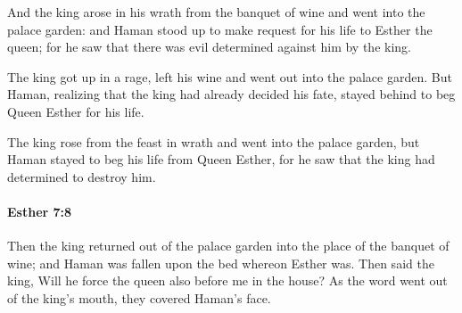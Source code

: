 			\begin{versebox}
					\item[BHS] 
					\item[LXX] 
					\item[ASV] And the king arose in his wrath from the banquet of wine and went into the palace garden: and Haman stood up to make request for his life to Esther the queen; for he saw that there was evil determined against him by the king.
					\item[NIV] The king got up in a rage, left his wine and went out into the palace garden. But Haman, realizing that the king had already decided his fate, stayed behind to beg Queen Esther for his life.
					\item[NRSV] The king rose from the feast in wrath and went into the palace garden, but Haman stayed to beg his life from Queen Esther, for he saw that the king had determined to destroy him.
			\end{versebox}

		\paragraph{Esther 7:8} %
			\label{ESTHER-7-8}

			Then the king returned out of the palace garden into the place of the banquet of wine; and Haman was fallen upon the bed whereon Esther was. Then said the king, Will he force the queen also before me in the house? As the word went out of the king’s mouth, they covered Haman’s face.

